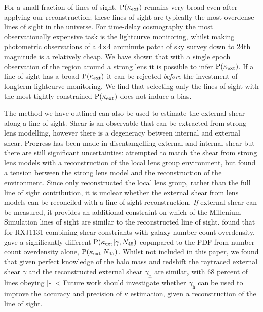 \documentclass[useAMS,usenatbib]{mn2e}
\begin{document}
For a small fraction of lines of sight, ${\rm P}(\kappa_{\rm ext})$ remains very broad even after applying our reconstruction; these lines of sight are typically the most overdense lines of sight in the universe. For time-delay cosmography the most observationally expensive task is the lightcurve monitoring, whilst making photometric observations of a 4$\times$4 arcminute patch of sky survey down to 24th magnitude is a relatively cheap. We have shown that with a single epoch observation of the region around a strong lens it is possible to infer ${\rm P}(\kappa_{\rm ext})$. If a line of sight has a broad ${\rm P}(\kappa_{\rm ext})$ it can be rejected {\it before} the investment of longterm lightcurve monitoring. We find that selecting only the lines of sight with the most tightly constrained ${\rm P}(\kappa_{\rm ext})$ does not induce a bias.

The method we have outlined can also be used to estimate the external shear
along a line of sight. Shear is an observable that can be extracted from
strong lens modelling, however there is a degeneracy between internal and
external shear. Progress has been made in disentangelling external and
internal shear \citep[\eg][]{xxx} but there are still significant
uncertainties: \citet{WongEtal2011} attempted to match the shear from strong
lens models with a reconstruction of the local lens group environment, but
found a tension between the strong lens model and the reconstruction of the
environment. Since \citet{WongEtal2011} only reconstructed the local lens
group, rather than the full line of sight contribution, it is unclear whether
the external shear from lens models can be reconciled with a line of sight
reconstruction. {\it If} external shear can be measured, it provides an
additional constraint on which of the Millenium Simulation lines of sight are
similar to the reconstructed line of sight. \citet{SuyuEtal2012} found that
for RXJ1131 combining shear constriants with galaxy number count overdensity,
gave a significantly different ${\rm P}(\kappa_{\rm ext}|\gamma,N_{45})$ copmpared to the
PDF from number count overdensity alone, ${\rm P}(\kappa_{\rm ext}|N_{45})$. Whilst not included
in this paper, we found that given perfect knowledge of the halo mass and redshift
the raytraced external shear $\gamma$ and the reconstructed external shear $\gamma_{\mathrm{h}}$ 
are similar, with 68 percent of lines obeying
\be
\label{eq:shearineq}
|{\boldmath{\gamma}-}| < 
\ee 
Future work should investigate whether $\gamma_{\mathrm{h}}$ can be used to improve
the accuracy and precision of $\kappa$ estimation, given a reconstruction
 of the line of sight. 
\end{document}
